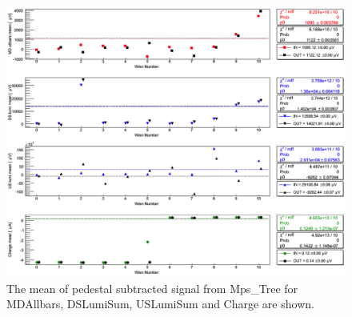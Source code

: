 \begin{singlespace}
\begin{figure}[!h]
	\centering
	\includegraphics[width=15.0cm]{figures/pedestalSum}
	\caption
	{The mean of pedestal subtracted signal from Mps\_Tree for MDAllbars, DSLumiSum, USLumiSum and Charge are shown.}
	\label{fig:pedestalSum}
\end{figure}
\end{singlespace}

